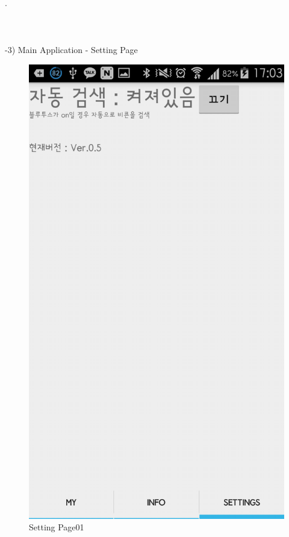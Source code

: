 \documentclass[conference]{IEEEtran}
\begin{document}
.\\\\\\\\
-3) Main Application - Setting Page
\begin{figure}[htbp]
\begin{center}
    \includegraphics[scale=0.2]{img_capture09}
    \caption{Setting Page01} 
\end{center}
\end{figure}
\end{document}
